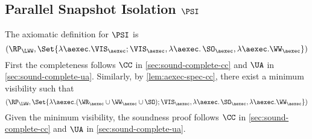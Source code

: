 \subsection{Parallel Snapshot Isolation \(\PSI\)}
\label{sec:sound-complete-psi}

The axiomatic definition for \( \PSI \) is 
\[ 
    (\RP_{\LWW}, \Set{\lambda \aexec. \VIS_{\aexec} ; \VIS_{\aexec}, \lambda \aexec \ldotp \SO_\aexec, \lambda \aexec. \WW_\aexec })
\]
First the completeness follows \( \CC \) in \cref{sec:sound-complete-cc} and \( \UA \) in \cref{sec:sound-complete-ua}.
Similarly, by \cref{lem:aexec-spec-cc},
there exist a minimum visibility such that 
\[ 
    (\RP_{\LWW}, \Set{\lambda \aexec. (\WR_{\aexec} \cup \WW_{\aexec} \cup \SO ) ; \VIS_{\aexec}, \lambda \aexec \ldotp \SO_\aexec, \lambda \aexec. \WW_\aexec })
\]
Given the minimum visibility, the soundness proof follows \( \CC \) in \cref{sec:sound-complete-cc} and \( \UA \) in \cref{sec:sound-complete-ua}.

